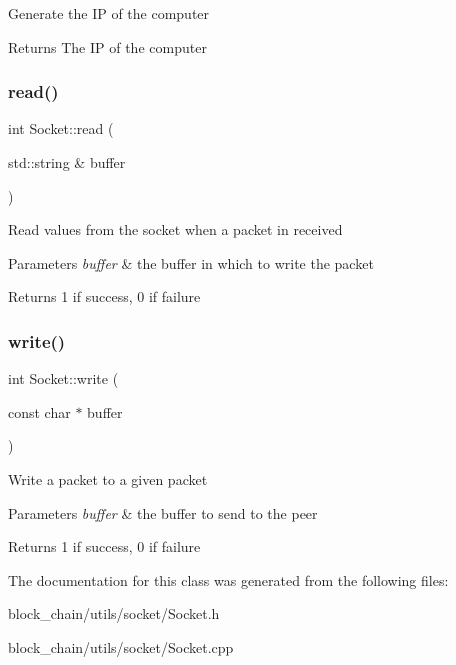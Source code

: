 Generate the IP of the computer

\begin{DoxyReturn}{Returns}
The IP of the computer 
\end{DoxyReturn}
\mbox{\label{classSocket_a74fc13f1e87009d84871d73949a664b2}} 
\subsubsection{\texorpdfstring{read()}{read()}}
{\footnotesize\ttfamily int Socket\+::read (\begin{DoxyParamCaption}\item[{std\+::string \&}]{buffer }\end{DoxyParamCaption})}

Read values from the socket when a packet in received


\begin{DoxyParams}{Parameters}
{\em buffer} & the buffer in which to write the packet \\
\hline
\end{DoxyParams}
\begin{DoxyReturn}{Returns}
1 if success, 0 if failure 
\end{DoxyReturn}
\mbox{\label{classSocket_ae2f8cf0b7d27c59600dc5ddf65f8a884}} 
\subsubsection{\texorpdfstring{write()}{write()}}
{\footnotesize\ttfamily int Socket\+::write (\begin{DoxyParamCaption}\item[{const char $\ast$}]{buffer }\end{DoxyParamCaption})}

Write a packet to a given packet


\begin{DoxyParams}{Parameters}
{\em buffer} & the buffer to send to the peer \\
\hline
\end{DoxyParams}
\begin{DoxyReturn}{Returns}
1 if success, 0 if failure 
\end{DoxyReturn}


The documentation for this class was generated from the following files\+:\begin{DoxyCompactItemize}
\item 
block\+\_\+chain/utils/socket/Socket.\+h\item 
block\+\_\+chain/utils/socket/Socket.\+cpp\end{DoxyCompactItemize}
